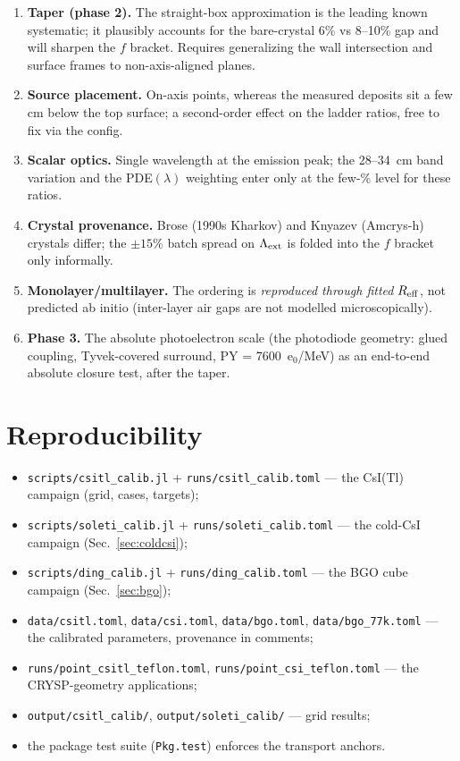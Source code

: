 \documentclass[11pt,a4paper]{article}
\newcommand{\csitl}{CsI(Tl)}
\newcommand{\lext}{\Lambda_{\rm ext}}
\begin{document}
\begin{enumerate}
  \item \textbf{Taper (phase 2).} The straight-box approximation is the leading known
    systematic; it plausibly accounts for the bare-crystal 6\% vs 8--10\% gap and will
    sharpen the $f$ bracket. Requires generalizing the wall intersection and surface
    frames to non-axis-aligned planes.
  \item \textbf{Source placement.} On-axis points, whereas the measured deposits sit a
    few cm below the top surface; a second-order effect on the ladder ratios, free to
    fix via the config.
  \item \textbf{Scalar optics.} Single wavelength at the emission peak; the
    28--34~cm band variation and the PDE$(\lambda)$ weighting enter only at the few-\%
    level for these ratios.
  \item \textbf{Crystal provenance.} Brose (1990s Kharkov) and Knyazev (Amcrys-h)
    crystals differ; the $\pm15\%$ batch spread on $\lext$ is folded into the $f$
    bracket only informally.
  \item \textbf{Monolayer/multilayer.} The ordering is \emph{reproduced through fitted}
    $R_{\rm eff}$, not predicted ab initio (inter-layer air gaps are not modelled
    microscopically).
  \item \textbf{Phase 3.} The absolute photoelectron scale (the photodiode geometry:
    glued coupling, Tyvek-covered surround, PY = 7600~e$_0$/MeV) as an end-to-end
    absolute closure test, after the taper.
\end{enumerate}

\section*{Reproducibility}

\begin{itemize}
  \item \texttt{scripts/csitl\_calib.jl} + \texttt{runs/csitl\_calib.toml} --- the
    \csitl{} campaign (grid, cases, targets);
  \item \texttt{scripts/soleti\_calib.jl} + \texttt{runs/soleti\_calib.toml} --- the
    cold-CsI campaign (Sec.~\ref{sec:coldcsi});
  \item \texttt{scripts/ding\_calib.jl} + \texttt{runs/ding\_calib.toml} --- the BGO
    cube campaign (Sec.~\ref{sec:bgo});
  \item \texttt{data/csitl.toml}, \texttt{data/csi.toml}, \texttt{data/bgo.toml},
    \texttt{data/bgo\_77k.toml} --- the calibrated parameters, provenance in comments;
  \item \texttt{runs/point\_csitl\_teflon.toml}, \texttt{runs/point\_csi\_teflon.toml}
    --- the CRYSP-geometry applications;
  \item \texttt{output/csitl\_calib/}, \texttt{output/soleti\_calib/} --- grid results;
  \item the package test suite (\texttt{Pkg.test}) enforces the transport anchors.
\end{itemize}
\end{document}
